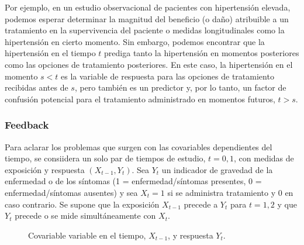 \documentclass[12pt]{article}
\begin{document}
Por ejemplo, en un estudio observacional de pacientes con hipertensión elevada, podemos esperar determinar
la magnitud del beneficio (o daño) atribuible a un tratamiento en la supervivencia del paciente o medidas
longitudinales como la hipertensión en cierto momento. Sin embargo, podemos encontrar que la hipertensión en el tiempo $t$
prediga tanto la hipertensión en momentos posteriores como las opciones de tratamiento posteriores. En este caso,
la hipertensión en el momento $s < t$ es la variable de respuesta para las opciones de tratamiento recibidas antes de $s$,
pero también es un predictor y, por lo tanto, un factor de confusión potencial para el tratamiento administrado
en momentos futuros, $t > s$.

\subsubsection{Feedback}

Para aclarar los problemas que surgen con las covariables dependientes del tiempo, se consiidera un solo par de tiempos de
estudio, $t = 0, 1$, con medidas de exposición y respuesta $(X_{t-1}, Y_t)$. Sea $Y_t$ un indicador de gravedad de la
enfermedad o de los síntomas (1 = enfermedad/síntomas presentes, 0 = enfermedad/síntomas ausentes) y sea $X_t = 1$
si se administra tratamiento y $0$ en caso contrario. Se supone que la exposición $X_{t-1}$ precede a $Y_t$ para
$t = 1, 2$ y que $Y_t$ precede o se mide simultáneamente con $X_t$.

\begin{figure}[h]
\centering
{}
\caption{Covariable variable en el tiempo, $X_{t-1}$, y respuesta $Y_t$.}
\end{figure}

\end{document}
